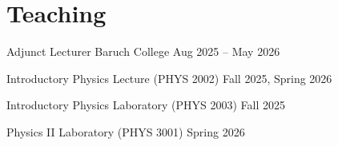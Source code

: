 \section{Teaching}

\begin{teaching}
{Adjunct Lecturer}
{Baruch College}
{Aug 2025 -- May 2026}

    \teachingcourse
    {Introductory Physics Lecture (PHYS 2002)}
    {Fall 2025, Spring 2026}

    \teachingcourse
    {Introductory Physics Laboratory (PHYS 2003)}
    {Fall 2025}

    \teachingcourse
    {Physics II Laboratory (PHYS 3001)}
    {Spring 2026}

\end{teaching}